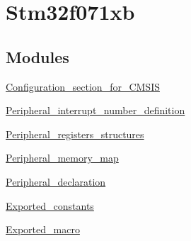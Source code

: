 \hypertarget{group__stm32f071xb}{}\section{Stm32f071xb}
\label{group__stm32f071xb}
\subsection*{Modules}
\begin{DoxyCompactItemize}
\item 
\hyperlink{group___configuration__section__for___c_m_s_i_s}{Configuration\+\_\+section\+\_\+for\+\_\+\+C\+M\+S\+IS}
\item 
\hyperlink{group___peripheral__interrupt__number__definition}{Peripheral\+\_\+interrupt\+\_\+number\+\_\+definition}
\item 
\hyperlink{group___peripheral__registers__structures}{Peripheral\+\_\+registers\+\_\+structures}
\item 
\hyperlink{group___peripheral__memory__map}{Peripheral\+\_\+memory\+\_\+map}
\item 
\hyperlink{group___peripheral__declaration}{Peripheral\+\_\+declaration}
\item 
\hyperlink{group___exported__constants}{Exported\+\_\+constants}
\item 
\hyperlink{group___exported__macro}{Exported\+\_\+macro}
\end{DoxyCompactItemize}
